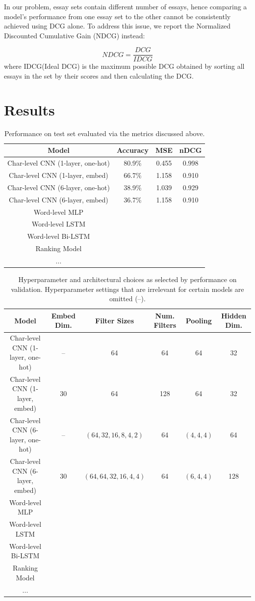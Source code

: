 \documentclass[10pt,psamsfonts]{amsart}
\theoremstyle{definition}
\theoremstyle{remark}
\numberwithin{equation}{section}
\begin{document}
In our problem, essay sets contain different number of essays, hence comparing a model's performance from one essay set to the other cannot be consistently achieved using DCG alone. To address this issue, we report the Normalized Discounted Cumulative Gain (NDCG) instead:

$$NDCG=\frac{DCG}{IDCG}$$
where IDCG(Ideal DCG) is the maximum possible DCG obtained by sorting all essays in the set by their scores and then calculating the DCG.

\section*{Results}

\begin{table}
	\begin{tabular}{c|c|c|c}
		Model & Accuracy & MSE & nDCG \\\hline
		Char-level CNN (1-layer, one-hot) & 80.9\% & 0.455 & 0.998 \\
		Char-level CNN (1-layer, embed) & 66.7\% & 1.158& 0.910\\
		Char-level CNN (6-layer, one-hot) & 38.9\% & 1.039 & 0.929 \\
		Char-level CNN (6-layer, embed) & 36.7\%& 1.158 & 0.910 \\
		Word-level MLP \\
		Word-level LSTM \\
		Word-level Bi-LSTM \\
		Ranking Model \\
		...
	\end{tabular}
	\caption{Performance on test set evaluated via the metrics discussed above.}
	\label{fig:eval}
\end{table}

\begin{table}
	\begin{tabular}{c|c|c|c|c|c}
		Model & Embed Dim. & Filter Sizes & Num. Filters & Pooling & Hidden Dim. \\\hline
		Char-level CNN (1-layer, one-hot) & -- & 64 & 64 & 64 & 32 \\
		Char-level CNN (1-layer, embed) &  30 & 64 & 128 & 64 & 32 \\
		Char-level CNN (6-layer, one-hot) & -- & $(64, 32, 16, 8, 4, 2)$ & 64 & $(4,4,4)$ & 64 \\
		Char-level CNN (6-layer, embed) & 30 & $(64, 64, 32, 16, 4, 4)$ & 64 & $(6,4,4)$ & 128 \\
		Word-level MLP  & & & & & \\
		Word-level LSTM  & & & & & \\
		Word-level Bi-LSTM  & & & & & \\
		Ranking Model & & & & & \\
		...  & & & & &
	\end{tabular}
	\caption{Hyperparameter and architectural choices as selected by performance on validation. Hyperparameter settings that are irrelevant for certain models are omitted (--).}
	\label{fig:params}
\end{table}
\end{document}
